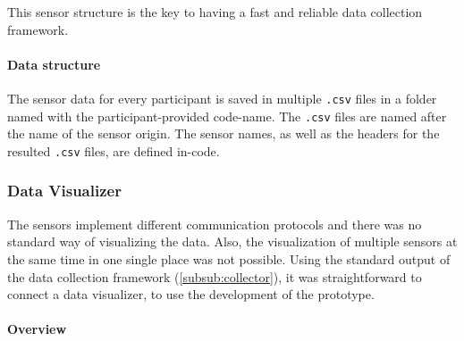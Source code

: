 
This sensor structure is the key to having a fast and reliable data collection framework.

\paragraph{Data structure}
\label{par:data_structure}

The sensor data for every participant is saved in multiple \texttt{.csv} files in a folder named with the participant-provided code-name. The \texttt{.csv} files are named after the name of the sensor origin. The sensor names, as well as the headers for the resulted \texttt{.csv} files, are defined in-code.

\subsubsection{Data Visualizer}
\label{subsub:visualizer}

The sensors implement different communication protocols and there was no standard way of visualizing the data. Also, the visualization of multiple sensors at the same time in one single place was not possible. Using the standard output of the data collection framework (\ref{subsub:collector}), it was straightforward to connect a data visualizer, to use the development of the prototype.

\paragraph{Overview}

